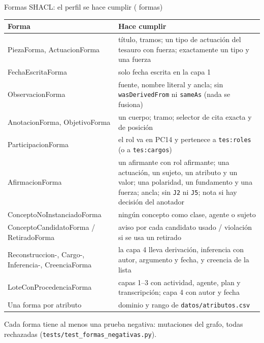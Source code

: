 \documentclass[aspectratio=169,10pt]{beamer}
\newcommand{\ttt}[1]{\texttt{\small #1}}
\begin{document}
\begin{frame}[shrink=7]{Formas SHACL: el perfil se hace cumplir (\cifraFormas{} formas)}
\scriptsize
\begin{tabular}{@{}p{4.4cm}p{8.8cm}@{}}
\toprule
Forma & Hace cumplir \\
\midrule
PiezaForma, ActuacionForma & título, tramos; un tipo de actuación del tesauro \alert{con fuerza}; exactamente un tipo y una fuerza \\
FechaEscritaForma & solo fecha escrita en la capa 1 \\
ObservacionForma & fuente, nombre literal y ancla; \alert{sin} \ttt{wasDerivedFrom} ni \ttt{sameAs} (nada se fusiona) \\
AnotacionForma, ObjetivoForma & un cuerpo; tramo; selector de cita exacta y de posición \\
ParticipacionForma & el rol va en PC14 y pertenece a \ttt{tes:roles} (o a \ttt{tes:cargos}) \\
AfirmacionForma & un afirmante con rol afirmante; una actuación, un sujeto, un atributo y un valor; una polaridad, un fundamento y una fuerza; ancla; \alert{sin \ttt{J2} ni \ttt{J5}}; nota si hay decisión del anotador \\
ConceptoNoInstanciadoForma & ningún concepto como clase, agente o sujeto \\
ConceptoCandidatoForma / RetiradoForma & aviso por cada candidato usado / violación si se usa un retirado \\
Reconstruccion-, Cargo-, Inferencia-, CreenciaForma & la capa 4 lleva derivación, inferencia con autor, argumento y fecha, y creencia de la lista \\
LoteConProcedenciaForma & capas 1--3 con actividad, agente, plan y transcripción; capa 4 con autor y fecha \\
Una forma por atributo & dominio y rango de \ttt{datos/atributos.csv} \\
\bottomrule
\end{tabular}

\medskip
\footnotesize Cada forma tiene al menos una \alert{prueba negativa}: \cifraMutacionesDeclaradas{} mutaciones del grafo, todas
rechazadas (\ttt{tests/test\_formas\_negativas.py}).
\end{frame}
\end{document}
